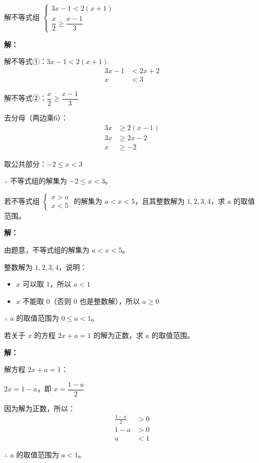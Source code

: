\documentclass[12pt, a4paper]{ctexart}
\begin{document}
\begin{examplebox}[【例题5】解较复杂的不等式组]
解不等式组 $\begin{cases} 3x - 1 < 2(x + 1) \\ \dfrac{x}{2} \geqslant \dfrac{x - 1}{3} \end{cases}$

\textbf{解：}

解不等式①：$3x - 1 < 2(x + 1)$
\begin{align*}
3x - 1 &< 2x + 2 \\
x &< 3
\end{align*}

解不等式②：$\dfrac{x}{2} \geqslant \dfrac{x - 1}{3}$

去分母（两边乘6）：
\begin{align*}
3x &\geqslant 2(x - 1) \\
3x &\geqslant 2x - 2 \\
x &\geqslant -2
\end{align*}

取公共部分：$-2 \leqslant x < 3$

$\therefore$ 不等式组的解集为 $-2 \leqslant x < 3$。
\end{examplebox}

\begin{examplebox}
若不等式组 $\begin{cases} x > a \\ x < 5 \end{cases}$ 的解集为 $a < x < 5$，且其整数解为 $1, 2, 3, 4$，求 $a$ 的取值范围。

\textbf{解：}

由题意，不等式组的解集为 $a < x < 5$。

整数解为 $1, 2, 3, 4$，说明：
\begin{itemize}[leftmargin=2em]
  \item $x$ 可以取 $1$，所以 $a < 1$
  \item $x$ 不能取 $0$（否则 $0$ 也是整数解），所以 $a \geqslant 0$
\end{itemize}

$\therefore$ $a$ 的取值范围为 $0 \leqslant a < 1$。
\end{examplebox}

\begin{examplebox}[【例题7】不等式与方程的综合]
若关于 $x$ 的方程 $2x + a = 1$ 的解为正数，求 $a$ 的取值范围。

\textbf{解：}

解方程 $2x + a = 1$：

$2x = 1 - a$，即 $x = \dfrac{1 - a}{2}$

因为解为正数，所以：
\begin{align*}
\frac{1 - a}{2} &> 0 \\
1 - a &> 0 \\
a &< 1
\end{align*}

$\therefore$ $a$ 的取值范围为 $a < 1$。
\end{examplebox}
\end{document}
